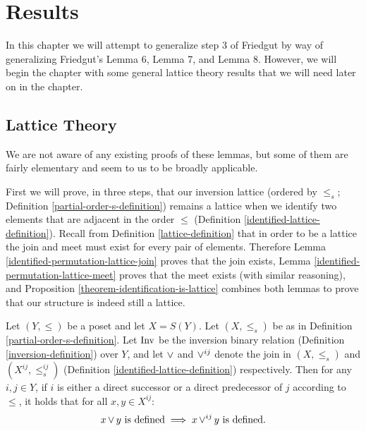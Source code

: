 
\chapter{Results}

	In this chapter we will attempt to generalize step 3 of Friedgut by way of generalizing Friedgut's Lemma 6, Lemma 7, and Lemma 8. However, we will begin the chapter with some general lattice theory results that we will need later on in the chapter.

\section{Lattice Theory}

	We are not aware of any existing proofs of these lemmas, but some of them are fairly elementary and seem to us to be broadly applicable.

	First we will prove, in three steps, that our inversion lattice (ordered by $\le_s$; Definition \ref{partial-order-s-definition}) remains a lattice when we identify two elements that are adjacent in the order $\le$ (Definition \ref{identified-lattice-definition}). Recall from Definition \ref{lattice-definition} that in order to be a lattice the join and meet must exist for every pair of elements. Therefore Lemma \ref{identified-permutation-lattice-join} proves that the join exists, Lemma \ref{identified-permutation-lattice-meet} proves that the meet exists (with similar reasoning), and Proposition \ref{theorem-identification-is-lattice} combines both lemmas to prove that our structure is indeed still a lattice.

	\begin{lemma}
		\label{identified-permutation-lattice-join}
		Let $(Y, \le)$ be a poset and let $X = S(Y)$. Let $(X, \le_s)$ be as in Definition \ref{partial-order-s-definition}. Let $\operatorname{Inv}$ be the inversion binary relation (Definition \ref{inversion-definition}) over $Y$, and let $\operatorname{\vee}$ and $\operatorname{\vee}^{ij}$ denote the join in $(X, \le_s)$ and $(X^{ij}, \le^{ij}_s)$ (Definition \ref{identified-lattice-definition}) respectively. Then for any $i,j \in Y$, if $i$ is either a direct successor or a direct predecessor of $j$ according to $\le$, it holds that for all $x, y \in X^{ij}$:
		\[
			x \operatorname{\vee} y \text{ is defined} \implies x \operatorname{\vee}^{ij} y \text{ is defined}.
		\]
	\end{lemma}


